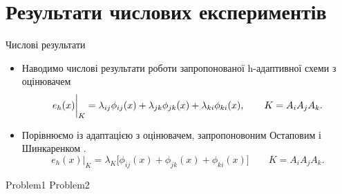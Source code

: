 
\section{Результати числових експериментів}

\frame{\sectionpage}
\begin{frame}{Числові результати}
	\begin{itemize}
		\item Наводимо числові результати роботи запропонованої h-адаптивної схеми з оцінювачем
			\begin{equation}
				e_h(x)\bigg|_K = \lambda_{ij} \phi_{ij}(x)+\lambda_{jk} \phi_{jk}(x)+\lambda_{ki} \phi_{ki}(x), \qquad K = A_iA_jA_k.
			\end{equation}
		\item Порівнюємо із адаптацією з оцінювачем, запропоновоним Остаповим і Шинкаренком .
			\begin{equation}
				e_h(x)\bigg|_K = \lambda_K \big[ \phi_{ij}(x) + \phi_{jk}(x) + \phi_{ki}(x)\big] \qquad K = A_iA_jA_k.
			\end{equation}
	\end{itemize}
\end{frame}

{Problem1}
{Problem2}
